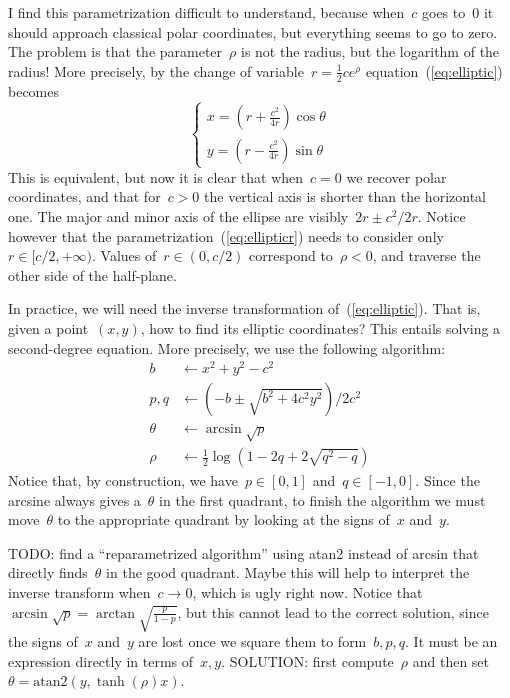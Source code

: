 I find this parametrization difficult to understand,
because when~$c$ goes to~$0$ it should approach classical polar
coordinates, but everything seems to go to zero.
The problem is that the parameter~$\rho$ is not the radius, but the
logarithm of the radius!  More precisely, by the change of
variable~$r=\frac12ce^\rho$ equation~(\ref{eq:elliptic}) becomes
\begin{equation}\label{eq:ellipticr}
	\begin{cases}
		x = \left(r + \frac{c^2}{4r}\right)\cos\theta \\
		y = \left(r - \frac{c^2}{4r}\right)\sin\theta
	\end{cases}
\end{equation}
This is equivalent, but now it is clear that when~$c=0$ we recover
polar coordinates, and that for~$c>0$ the vertical axis is shorter
than the horizontal one.  The major and minor axis of the ellipse are
visibly~$2r\pm c^2/2r$.
Notice however that the
parametrization~(\ref{eq:ellipticr}) needs to consider
only~$r\in[c/2,+\infty)$.  Values of~$r\in(0,c/2)$ correspond
to~$\rho<0$, and traverse the other side of the half-plane.


In practice, we will need the inverse transformation
of~(\ref{eq:elliptic}).  That is, given a point~$(x,y)$, how to
find its elliptic coordinates?  This entails solving a second-degree
equation.  More precisely, we use the following algorithm:
\begin{align*}
	b   & \leftarrow x^2+y^2-c^2 \\
	p,q & \leftarrow \left(-b\pm\sqrt{b^2+4c^2y^2}\right)/{2c^2} \\
	\theta & \leftarrow \arcsin\sqrt{p} \\
	\rho & \leftarrow  \frac12\log\left(1-2q+2\sqrt{q^2-q}\right)
\end{align*}
Notice that, by construction, we have~$p\in[0,1]$ and~$q\in[-1,0]$.
Since the arcsine
always gives a~$\theta$ in the first quadrant, to finish the
algorithm we must move~$\theta$ to the appropriate quadrant by
looking at the signs of~$x$ and~$y$.

TODO: find a ``reparametrized algorithm'' using atan2 instead of
arcsin that directly finds~$\theta$ in the good quadrant.  Maybe this
will help to interpret the inverse transform when~$c\to0$, which is
ugly right now.  Notice that~$\arcsin\sqrt
p=\arctan\sqrt{\frac{p}{1-p}}$, but this cannot lead to the correct
solution, since the signs of~$x$ and~$y$ are lost once we square
them to form~$b,p,q$.  It must be an expression directly in terms
of~$x,y$.  SOLUTION: first compute~$\rho$ and then
set~$\theta=\mathrm{atan2}\left(y,\tanh(\rho) x\right)$.

